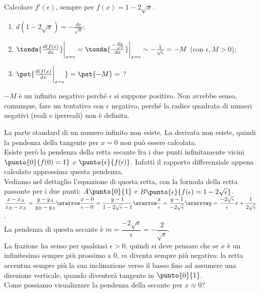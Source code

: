 \begin{esempio}
Calcolare $f'(\epsilon)$, sempre per  $f(x)=1-2\sqrt{x}$.\\
\begin{enumerate} [noitemsep]
 \item $d(1-2\sqrt{x})=-\frac{dx}{\sqrt{x}}$;
 \item $\tonda{\frac{d(f(x)}{dx}}\bigg|_{x=\epsilon}=
  \tonda{\frac{-\frac{dx}{\sqrt{x}}}{dx}}\bigg|_{x=\epsilon}\sim
  -\frac{1}{\sqrt{\epsilon}}=-M$ (con $\epsilon, M >0$);
 \item $\pst{\frac{d(f(x)}{dx}\bigg|_{x=\epsilon}}=\pst{-M}=$ ?
\end{enumerate} 
\begin{osservazione}
 $-M$ è un infinito negativo perché $\epsilon$ si suppone positivo. Non 
avrebbe 
 senso, comunque, fare un tentativo con $\epsilon$ negativo, perché la 
radice
 quadrata di numeri negativi (reali e iperreali) non è definita.\\
\end{osservazione} 

La parte standard di un numero infinito non esiste. La derivata non esiste, 
quindi la pendenza della tangente per $x=0$ non può essere calcolata.\\
Esiste però la pendenza della retta secante
fra i due punti infinitamente vicini $\punto{0}{f(0)=1}$ e 
$\punto{\epsilon}{f(\epsilon)}$. Infatti il rapporto 
differenziale appena calcolato approssima questa pendenza.\\
Vediamo nel dettaglio l'equazione di questa retta, con la formula della
retta passante per i due punti: $A\punto{0}{1}$ e 
$B\punto{\epsilon}{f(\epsilon)=1-2\sqrt{\epsilon}}$.\\
$\dfrac{x-x_A}{x_B-x_A}=\dfrac{y-y_A}{y_B-y_A}\srarrow
\dfrac{x-0}{\epsilon-0}=\dfrac{y-1}{1-2\sqrt{\epsilon}-1}\srarrow
\dfrac{x}{\epsilon}=\dfrac{y-1}{-2\sqrt{\epsilon}}\srarrow
y=\dfrac{-2\sqrt{\epsilon}}{\epsilon}x+\dfrac{1}{2\sqrt{\epsilon}}$.\\
La pendenza di questa secante è $m=\dfrac{-2\sqrt{\epsilon}}{\epsilon}=
-\dfrac{2}{\sqrt{\epsilon}}$.\\
La frazione ha senso per qualsiasi $\epsilon>0$, quindi si deve pensare
che se $x$ è un infinitesimo sempre più prossimo a $0$, $m$ diventa
sempre più negativa: la retta accentua sempre più la sua inclinazione verso
il basso fino ad assumere una direzione verticale, quando diventerà 
tangente in 
$\punto{0}{1}$.\\
Come possiamo visualizzare la pendenza della secante per $x\approx 0$?


\end{esempio}
